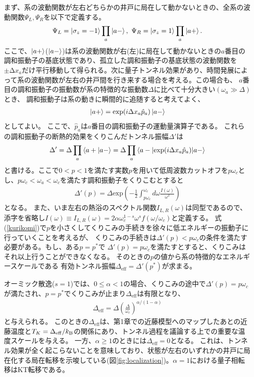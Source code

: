 まず、系の波動関数が左右どちらかの井戸に局在して動かないときの、全系の波動関数$\Psi_L,\Psi_R$を以下で定義する。
\begin{eqnarray}
	\Psi_L=\ket{\sigma_z=-1}\prod_{a}\ket{a-},\ 
	\Psi_R=\ket{\sigma_z=1}\prod_{a}\ket{a+}.
\end{eqnarray}
ここで、$\ket{a+}$($\ket{a-}$)は系の波動関数が右(左)に局在して動かないときの$a$番目の調和振動子の基底状態であり、孤立した調和振動子の基底状態の波動関数を$\pm \mathrm{\Delta}x_a$だけ平行移動して得られる。次に量子トンネル効果があり、時間発展によって系の波動関数が左右の井戸間を行き来する場合を考える。この場合も、
$a$番目の調和振動子の振動数が系の特徴的な振動数$\Delta$に比べて十分大きい$(\omega_a\gg\Delta)$とき、
調和振動子は系の動きに瞬間的に追随すると考えてよく、
\begin{eqnarray}
	\ket{a+}=\mathrm{exp}(i\mathrm{\Delta}x_a\hat{p}_a)\ket{a-}
\end{eqnarray}
としてよい。
ここで、$\hat{p}_a$は$a$番目の調和振動子の運動量演算子である。
これらの調和振動子の断熱的効果をくりこんだトンネル振幅$\Delta'$は
\begin{eqnarray}
	\Delta'=\Delta\prod_{a}\braket{ a+ | a- }
	=\Delta\prod_{a}\braket{ a-| \mathrm{exp}(i\mathrm{\Delta}x_a\hat{p}_a) | a- }
\end{eqnarray}
と書ける。ここで$0<p<1$を満たす実数$p$を用いて低周波数カットオフを$p\omega_c$とし、$p \omega_c<\omega_a<\omega_c$を満たす調和振動子をくりこむとすると
\begin{eqnarray}
	\Delta'(p)=\Delta \mathrm{exp}\left(-\frac{1}{2}\int_{p \omega_c}^{\omega_c}d\omega\frac{I(\omega)}{\omega^2}\right)
	\label{kurikomi}
\end{eqnarray}
となる。
また、いま左右の熱浴のスペクトル関数$I_{L,R}(\omega)$は同型であるので、添字を省略し$I(\omega)\equiv I_{L,R}(\omega)=2\alpha\omega_c^{1-s}\omega^sf(\omega/\omega_c)$と定義する。
式(\ref{kurikomi})で$p$を小さくしてくりこみの手続きを徐々に低エネルギーの振動子に行っていくことを考えるが、
くりこみの手続きは$\Delta'(p) < p \omega_c$の条件を満たす必要がある。もし、ある$p=p^\ast$で
$\Delta'(p) = p \omega_c$を満たすとすると、くりこみはそれ以上行うことができなくなる。
そのときの$p$の値から系の特徴的なエネルギースケールである
有効トンネル振幅$\Delta_{\mathrm{eff}} = \Delta'(p^\ast)$が求まる。

オーミック散逸($s=1$)では、$0\le \alpha < 1$の場合、くりこみの途中で$\Delta'(p)=p\omega_c$が満たされ、$p=p^{\ast}$でくりこみが止まり$\Delta_{\mathrm{eff}}$は有限となり、
\begin{eqnarray}
\Delta_{\mathrm{eff}} = \Delta \left(\frac{\Delta}{\omega_c} \right)^{\alpha/(1-\alpha)}
\end{eqnarray}
と与えられる。
このときの$\Delta_{\mathrm{eff}}$は、第1章での近藤模型へのマップしたあとの近藤温度と$T_K = \Delta_{\rm eff} /k_{\rm B}$の関係にあり\cite{Leggett87,SaitoKato13}、トンネル過程を議論する上での重要な温度スケールを与える。
一方、$\alpha \ge 1$のときには$\Delta_{\mathrm{eff}}=0$となる。
これは、トンネル効果が全く起こらないことを意味しており、状態が左右のいずれかの井戸に局在化する局在転移を示唆している(図\ref{fig:localization})。$\alpha = 1$における量子相転移はKT転移である。

